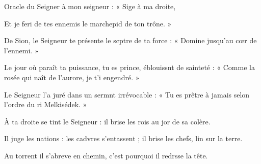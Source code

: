 \item Oracle du Seigner à mon seigneur :\psstar{} « Sige à ma droite,
\item Et je feri de tes ennemis\psstar{} le marchepid de ton trône. »
\item De Sion, le Seigneur te présente le scptre de ta force :\psstar{} « Domine jusqu’au cœr de l’ennemi. »
\item Le jour où paraît ta puissance, tu es prince, éblouissnt de sainteté :\psstar{} « Comme la rosée qui naît de l’aurore, je t’i engendré. »
\item Le Seigneur l’a juré dans un sermnt irrévocable :\psstar{} « Tu es prêtre à jamais selon l’ordre du ri Melkisédek. »
\item À ta droite se tint le Seigneur :\psstar{} il brise les rois au jor de sa colère.
\item Il juge les nations : les cadvres s’entassent ;\psstar{} il brise les chefs, lin sur la terre.
\item Au torrent il s’abreve en chemin,\psstar{} c’est pourquoi il redrsse la tête.